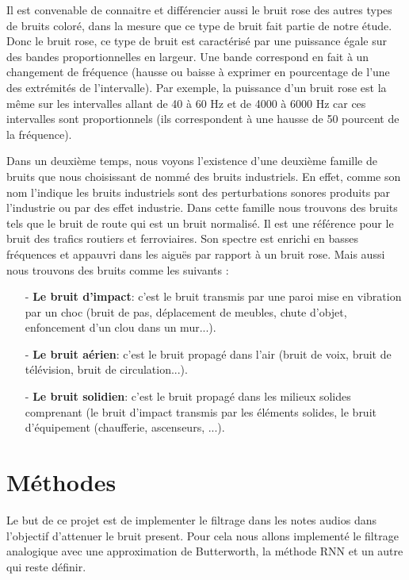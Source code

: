 \documentclass[conference,onecolumn]{IEEEtran}
\begin{document}
\begin{itemize}
    Il est convenable de connaitre et différencier aussi le bruit rose des autres types de bruits coloré, dans la mesure que ce type de bruit fait partie de notre étude. Donc le bruit rose, ce type de bruit est caractérisé par une puissance égale sur des bandes proportionnelles en largeur. Une bande correspond en fait à un changement de fréquence (hausse ou baisse à exprimer en pourcentage de l’une des extrémités de l’intervalle). Par exemple, la puissance d’un bruit rose est la même sur les intervalles allant de 40 à 60 Hz et de 4000 à 6000 Hz car ces intervalles sont proportionnels (ils correspondent à une hausse de 50 pourcent de la fréquence). 

\end{itemize}
\hfill

Dans un deuxième temps, nous voyons l’existence d’une deuxième
famille de bruits que nous choisissant de nommé des bruits
industriels. En effet, comme son nom l’indique les bruits
industriels sont des perturbations sonores produits par l’industrie
ou par des effet industrie. Dans cette famille nous trouvons des
bruits tels que le bruit de route qui est un bruit normalisé. Il est
une référence pour le bruit des trafics routiers et ferroviaires.
Son spectre est enrichi en basses fréquences et appauvri dans les
aiguës par rapport à un bruit rose. Mais aussi nous trouvons des
bruits comme les suivants :
\hfill

\begin{itemize}

    \item[-] \textbf{Le bruit d’impact}: c’est le bruit transmis par une paroi mise en vibration par un choc (bruit de pas, déplacement de meubles, chute d’objet, enfoncement d’un clou dans un mur...).
    \item[-] \textbf{Le bruit aérien}: c’est le bruit propagé dans l’air (bruit de voix, bruit de télévision, bruit de circulation...). 
    \item[-] \textbf{Le bruit solidien}: c’est le bruit propagé dans les milieux solides comprenant (le bruit d’impact transmis par les éléments solides, le bruit d’équipement (chaufferie, ascenseurs, ...). 
    
\end{itemize}

\newpage
\section{Méthodes}
Le but de ce projet est de implementer le filtrage dans les notes audios dans l'objectif d'attenuer le bruit present. Pour cela nous allons implementé le filtrage analogique avec une approximation de Butterworth, la méthode RNN et un autre qui reste définir.
\end{document}

